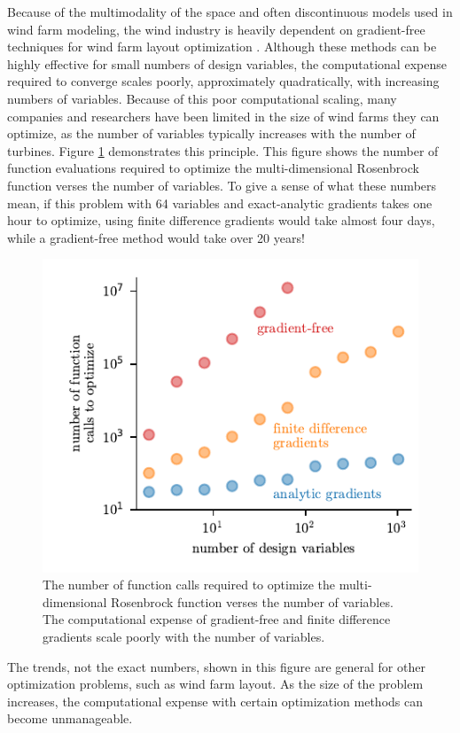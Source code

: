 \documentclass[wes, manuscript]{copernicus}
\begin{document}
Because of the multimodality of the space and often discontinuous models used in wind farm modeling, the wind industry is heavily dependent on gradient-free techniques for wind farm layout optimization  \citep{herbert2014review}.
Although these methods can be highly effective for small numbers of design variables, the computational expense required to converge scales poorly, approximately quadratically, with increasing numbers of variables. Because of this poor computational scaling, many companies and researchers have been limited in the size of wind farms they can optimize, as the number of variables typically increases with the number of turbines. Figure \ref{scale} demonstrates this principle. This figure shows the number of function evaluations required to optimize the multi-dimensional Rosenbrock function verses the number of variables. To give a sense of what these numbers mean, if this problem with 64 variables and exact-analytic gradients takes one hour to optimize, using finite difference gradients would take almost four days, while a gradient-free method would take over 20 years!
%
\begin{figure}
\centering
\includegraphics{paper-figures/scaling}
\caption{The number of function calls required to optimize the multi-dimensional Rosenbrock function verses the number of variables. The computational expense of gradient-free and finite difference gradients scale poorly with the number of variables.}
\label{scale}
\end{figure}
%
The trends, not the exact numbers, shown in this figure are general for other optimization problems, such as wind farm layout. As the size of the problem increases, the computational expense with certain optimization methods can become unmanageable.
\end{document}
